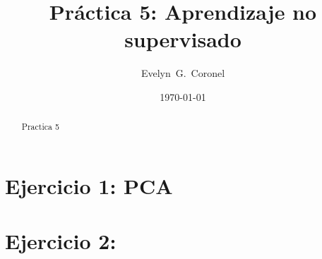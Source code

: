 



\title{Práctica 5: Aprendizaje no supervisado}
\author{Evelyn~G.~Coronel}


\date[]{\lowercase{\today}} %

\begin{abstract}
Practica 5
\end{abstract} 
\maketitle
%

\section{Ejercicio 1: PCA}


\section{Ejercicio 2: }
